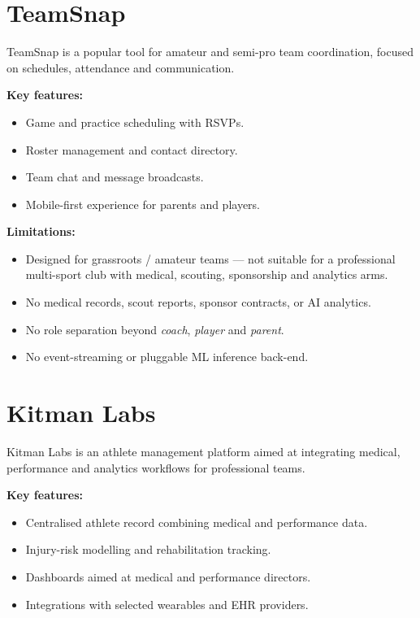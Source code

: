 \documentclass[12pt,a4paper,oneside]{report}
\begin{document}
\section{TeamSnap}
\label{sec:prevwork-teamsnap}
TeamSnap is a popular tool for amateur and semi-pro team coordination,
focused on schedules, attendance and communication.

\textbf{Key features:}
\begin{itemize}[leftmargin=*]
  \item Game and practice scheduling with RSVPs.
  \item Roster management and contact directory.
  \item Team chat and message broadcasts.
  \item Mobile-first experience for parents and players.
\end{itemize}

\textbf{Limitations:}
\begin{itemize}[leftmargin=*]
  \item Designed for grassroots / amateur teams --- not suitable for
        a professional multi-sport club with medical, scouting,
        sponsorship and analytics arms.
  \item No medical records, scout reports, sponsor contracts, or AI
        analytics.
  \item No role separation beyond \emph{coach}, \emph{player} and
        \emph{parent}.
  \item No event-streaming or pluggable ML inference back-end.
\end{itemize}

\section{Kitman Labs}
\label{sec:prevwork-kitman}
Kitman Labs is an athlete management platform aimed at integrating
medical, performance and analytics workflows for professional teams.

\textbf{Key features:}
\begin{itemize}[leftmargin=*]
  \item Centralised athlete record combining medical and performance
        data.
  \item Injury-risk modelling and rehabilitation tracking.
  \item Dashboards aimed at medical and performance directors.
  \item Integrations with selected wearables and EHR providers.
\end{itemize}
\end{document}
